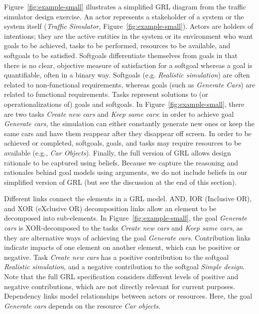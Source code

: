 Figure~\ref{fig:example-small} illustrates a simplified GRL diagram from the traffic simulator design exercise. An actor represents a stakeholder of a system or the system itself (\emph{Traffic Simulator}, Figure~\ref{fig:example-small}). Actors are holders of intentions; they are the active entities in the system or its environment who want goals to be achieved, tasks to be performed, resources to be available, and softgoals to be satisfied. Softgoals differentiate themselves from goals in that there is no clear, objective measure of satisfaction for a softgoal whereas a goal is quantifiable, often in a binary way. Softgoals (e.g. \emph{Realistic simulation}) are often related to non-functional requirements, whereas goals (such as \emph{Generate Cars}) are related to functional requirements. Tasks represent solutions to (or operationalizations of) goals and softgoals. In Figure~\ref{fig:example-small}, there are two tasks \emph{Create new cars} and \emph{Keep same cars}: in order to achieve goal \emph{Generate cars}, the simulation can either constantly generate new ones or keep the same cars and have them reappear after they disappear off screen. In order to be achieved or completed, softgoals, goals, and tasks may require resources to be available (e.g., \emph{Car Objects}). Finally, the full version of GRL allows design rationale to be captured using beliefs. Because we capture the reasoning and rationales behind goal models using arguments, we do not include beliefs in our simplified version of GRL (but see the discussion at the end of this section).

Different links connect the elements in a GRL model. AND, IOR (Inclusive OR), and XOR (eXclusive OR) decomposition links allow an element to be decomposed into sub-elements. In Figure~\ref{fig:example-small}, the goal \emph{Generate cars} is XOR-decomposed to the tasks \emph{Create new cars} and \emph{Keep same cars}, as they are alternative ways of achieving the goal \emph{Generate cars}. Contribution links indicate impacts of one element on another element, which can be positive or negative. Task \emph{Create new cars} has a positive contribution to the softgoal \emph{Realistic simulation}, and a negative contribution to the softgoal \emph{Simple design}. Note that the full GRL specification considers different levels of positive and negative contributions, which are not directly relevant for current purposes. Dependency links model relationships between actors or resources. Here, the goal \emph{Generate cars} depends on the resource \emph{Car objects}. 

